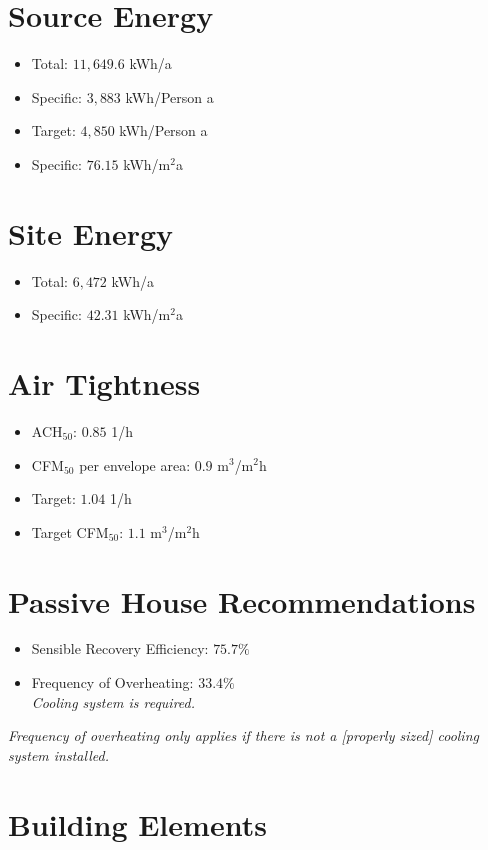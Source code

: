 \documentclass{article}
\begin{document}
\section*{Source Energy}
\begin{itemize}
    \item Total: $11,649.6$ kWh/a
    \item Specific: $3,883$ kWh/Person a
    \item Target: $4,850$ kWh/Person a
    \item Specific: $76.15$ kWh/m$^2$a
\end{itemize}

\section*{Site Energy}
\begin{itemize}
    \item Total: $6,472$ kWh/a
    \item Specific: $42.31$ kWh/m$^2$a
\end{itemize}

\section*{Air Tightness}
\begin{itemize}
    \item ACH$_{50}$: $0.85$ 1/h
    \item CFM$_{50}$ per envelope area: $0.9$ m$^3$/m$^2$h
    \item Target: $1.04$ 1/h
    \item Target CFM$_{50}$: $1.1$ m$^3$/m$^2$h
\end{itemize}

\section*{Passive House Recommendations}
\begin{itemize}
    \item Sensible Recovery Efficiency: $75.7\%$
    \item Frequency of Overheating: $33.4\%$ \\
    \textit{Cooling system is required.}
\end{itemize}
\textit{Frequency of overheating only applies if there is not a [properly sized] cooling system installed.}


\section*{Building Elements}
\end{document}
